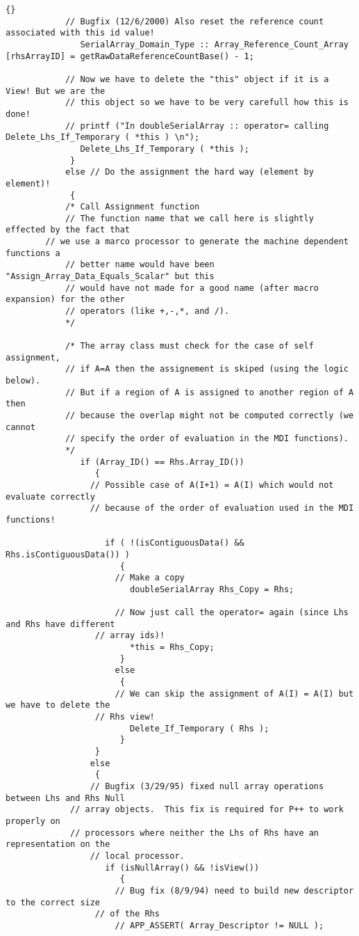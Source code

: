 \documentclass[10pt]{llncs}
\begin{document}
\begin{lstlisting}{}
            // Bugfix (12/6/2000) Also reset the reference count associated with this id value!
               SerialArray_Domain_Type :: Array_Reference_Count_Array [rhsArrayID] = getRawDataReferenceCountBase() - 1;

            // Now we have to delete the "this" object if it is a View! But we are the 
            // this object so we have to be very carefull how this is done!
            // printf ("In doubleSerialArray :: operator= calling Delete_Lhs_If_Temporary ( *this ) \n");
               Delete_Lhs_If_Temporary ( *this );
             }
            else // Do the assignment the hard way (element by element)!
             {
            /* Call Assignment function
            // The function name that we call here is slightly effected by the fact that 
	    // we use a marco processor to generate the machine dependent functions a 
            // better name would have been "Assign_Array_Data_Equals_Scalar" but this 
            // would have not made for a good name (after macro expansion) for the other 
            // operators (like +,-,*, and /).
            */

            /* The array class must check for the case of self assignment,
            // if A=A then the assignement is skiped (using the logic below).
            // But if a region of A is assigned to another region of A then
            // because the overlap might not be computed correctly (we cannot
            // specify the order of evaluation in the MDI functions).
            */
               if (Array_ID() == Rhs.Array_ID())
                  {
                 // Possible case of A(I+1) = A(I) which would not evaluate correctly 
                 // because of the order of evaluation used in the MDI functions!
     
                    if ( !(isContiguousData() && Rhs.isContiguousData()) )
                       {
                      // Make a copy
                         doubleSerialArray Rhs_Copy = Rhs;

                      // Now just call the operator= again (since Lhs and Rhs have different 
	              // array ids)!
                         *this = Rhs_Copy;
                       }
                      else
                       {
                      // We can skip the assignment of A(I) = A(I) but we have to delete the 
	              // Rhs view!
                         Delete_If_Temporary ( Rhs );
                       }
                  }
                 else
                  {
                 // Bugfix (3/29/95) fixed null array operations between Lhs and Rhs Null 
	         // array objects.  This fix is required for P++ to work properly on 
	         // processors where neither the Lhs of Rhs have an representation on the 
                 // local processor.
                    if (isNullArray() && !isView())
                       {
                      // Bug fix (8/9/94) need to build new descriptor to the correct size 
	              // of the Rhs
                      // APP_ASSERT( Array_Descriptor != NULL );


\end{lstlisting}
\end{document}
